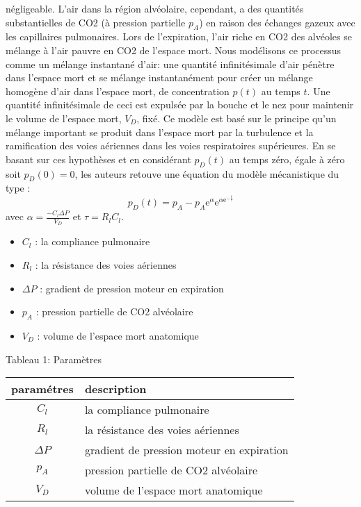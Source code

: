 \documentclass[12pt,]{article}
\providecommand{\tightlist}{%
  \setlength{\itemsep}{0pt}\setlength{\parskip}{0pt}}
\begin{document}
négligeable. L'air dans la région alvéolaire, cependant, a des quantités
substantielles de CO2 (à pression partielle \(p_{A}\)) en raison des
échanges gazeux avec les capillaires pulmonaires. Lors de l'expiration,
l'air riche en CO2 des alvéoles se mélange à l'air pauvre en CO2 de
l'espace mort. Nous modélisons ce processus comme un mélange instantané
d'air: une quantité infinitésimale d'air pénètre dans l'espace mort et
se mélange instantanément pour créer un mélange homogène d'air dans
l'espace mort, de concentration \(p(t)\) au temps \(t\). Une quantité
infinitésimale de ceci est expulsée par la bouche et le nez pour
maintenir le volume de l'espace mort, \(V_{D}\), fixé. Ce modèle est
basé sur le principe qu'un mélange important se produit dans l'espace
mort par la turbulence et la ramification des voies aériennes dans les
voies respiratoires supérieures. En se basant sur ces hypothèses et en
considérant \(p_{D}(t)\) au temps zéro, égale à zéro soit
\(p_{D}(0)=0\), les auteurs retouve une équation du modèle mécanistique
du type : \[
p_{D}(t)=p_{A} - p_{A} \mathrm{e}^{\alpha} \mathrm{e}^{\alpha\mathrm{e}^{-\frac{t}{\tau}}} 
\tag{1}
\] avec \(\alpha= \frac{-C_{l}\Delta P}{V_{D}}\) et \(\tau=R_{l}C_{l}\).

\begin{itemize}
\tightlist
\item
  \(C_{l}\) : la compliance pulmonaire
\item
  \(R_{l}\) : la résistance des voies aériennes
\item
  \(\Delta P\) : gradient de pression moteur en expiration
\item
  \(p_{A}\) : pression partielle de CO2 alvéolaire
\item
  \(V_{D}\) : volume de l'espace mort anatomique
\end{itemize}

Tableau 1: Paramètres

\begin{longtable}[]{@{}cl@{}}
\toprule
paramétres & description\tabularnewline
\midrule
\endhead
\(C_{l}\) & la compliance pulmonaire\tabularnewline
\(R_{l}\) & la résistance des voies aériennes\tabularnewline
\(\Delta P\) & gradient de pression moteur en expiration\tabularnewline
\(p_{A}\) & pression partielle de CO2 alvéolaire\tabularnewline
\(V_{D}\) & volume de l'espace mort anatomique\tabularnewline
\bottomrule
\end{longtable}
\end{document}
